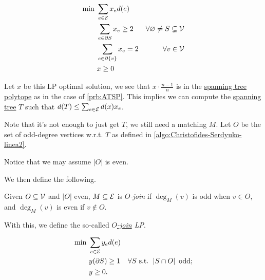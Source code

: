 \begin{equation}\label{eq:lec12-1}
	\begin{aligned}
		\min~ & \sum_{e\in \mathcal{\MakeUppercase{e}} } x_e d(e)                                                                     \\
		      & \sum_{e\in \partial S} x_e \geq 2                 & \forall \varnothing \neq S \subsetneq \mathcal{\MakeUppercase{v}} \\
		      & \sum_{e\in \partial \{v\}} x_e = 2                & \forall v\in \mathcal{\MakeUppercase{v}}                          \\
		      & x \geq 0
	\end{aligned}
\end{equation}

Let \(x\) be this LP optimal solution, we see that \(x\cdot \frac{n-1}{n}\) is in the \hyperref[eq:lec12-1]{spanning tree polytope} as in the case of \autoref{prb:ATSP}. This implies we can compute the \hyperref[def:spanning-tree]{spanning tree} \(T\) such that \(d(T) \leq \sum_{e\in \mathcal{\MakeUppercase{e}} } d(x)x_e\).

Note that it's not enough to just get \(T\), we still need a matching \(M\). Let \(O\) be the set of odd-degree vertices w.r.t. \(T\) as defined in \autoref{algo:Christofides-Serdyuko-linea2}.
\begin{note}
	Notice that we may assume \(\left\vert O \right\vert \) is even.
\end{note}

We then define the following.

\begin{definition}[\(O\)-join]\label{def:O-join}
	Given \(O\subseteq \mathcal{\MakeUppercase{v}} \) and \(\left\vert O \right\vert \) even, \(M \subseteq \mathcal{\MakeUppercase{e}} \) is \emph{\(O\)-join} if \(\deg_M(v)\) is odd when \(v\in O\), and \(\deg_M(v)\) is even if \(v \notin O\).
\end{definition}

With this, we define the so-called \emph{\hyperref[def:O-join]{\(O\)-join} LP}.

\begin{equation}\label{eq:lec12-2}
	\begin{aligned}
		\min~ & \sum_{e\in \mathcal{\MakeUppercase{e}} } y_e d(e)                                                                      \\
		      & y(\partial S) \geq 1                              & \forall S\text{ s.t. }\left\vert S \cap O \right\vert \text{ odd}; \\
		      & y\geq 0.
	\end{aligned}
\end{equation}

